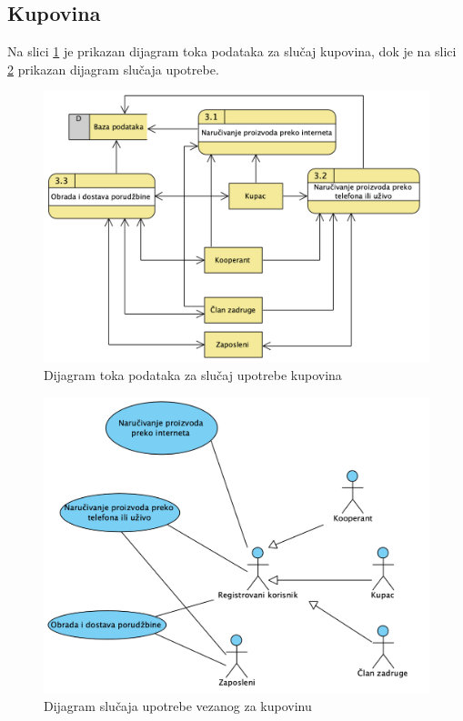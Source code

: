 \documentclass[a4paper]{article}
\begin{document}
\subsection{Kupovina}

Na slici \ref{dtp_kupovina} je prikazan dijagram toka podataka za slučaj kupovina, dok je na slici \ref{dslucup_kupovina} prikazan dijagram slučaja upotrebe.
\begin{figure}[h!]
    \centering
    \includegraphics[scale=0.64]{images/dtp_kupovina.png}
    \caption{Dijagram toka podataka za slučaj upotrebe kupovina}
    \label{dtp_kupovina}
\end{figure}

\begin{figure}[h!]
    \centering
    \includegraphics[scale=0.64]{images/dslucup_kupovina.png}
    \caption{Dijagram slučaja upotrebe vezanog za kupovinu}
    \label{dslucup_kupovina}
\end{figure}
\end{document}
